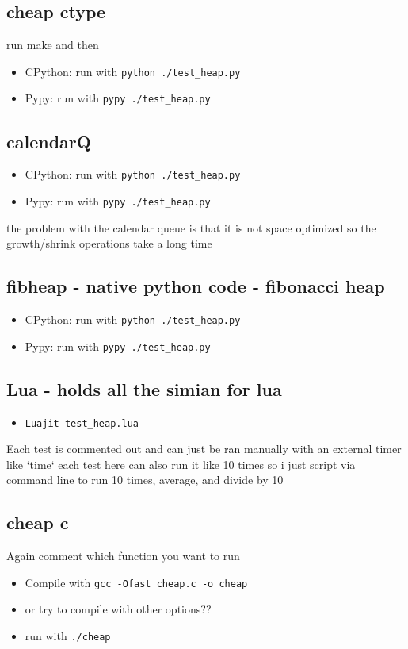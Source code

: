 \documentclass[11pt]{article}
\begin{document}
\subsection{cheap ctype}
\label{sec-3-4}
run make and then 
\begin{itemize}
\item CPython: run with \verb~python ./test_heap.py~
\item Pypy: run with  \verb~pypy ./test_heap.py~
\end{itemize}
\subsection{calendarQ}
\label{sec-3-5}
\begin{itemize}
\item CPython: run with \verb~python ./test_heap.py~
\item Pypy: run with  \verb~pypy ./test_heap.py~
\end{itemize}
the problem with the calendar queue is that it is not space 
optimized so the growth/shrink operations take a long time

\subsection{fibheap - native python code - fibonacci heap}
\label{sec-3-6}
\begin{itemize}
\item CPython: run with \verb~python ./test_heap.py~
\item Pypy: run with  \verb~pypy ./test_heap.py~
\end{itemize}

\subsection{Lua - holds all the simian for lua}
\label{sec-3-7}
\begin{itemize}
\item \verb~Luajit test_heap.lua~
\end{itemize}
Each test is commented out and can just be ran manually 
with an external timer like `time` each test here can also
run it like 10 times so i just script via command line to 
run 10 times, average, and divide by 10 

\subsection{cheap c}
\label{sec-3-8}
Again comment which function you want to run
\begin{itemize}
\item Compile with \verb~gcc -Ofast cheap.c -o cheap~
\item or try to compile with other options??
\item run with \verb~./cheap~
\end{itemize}
\end{document}
